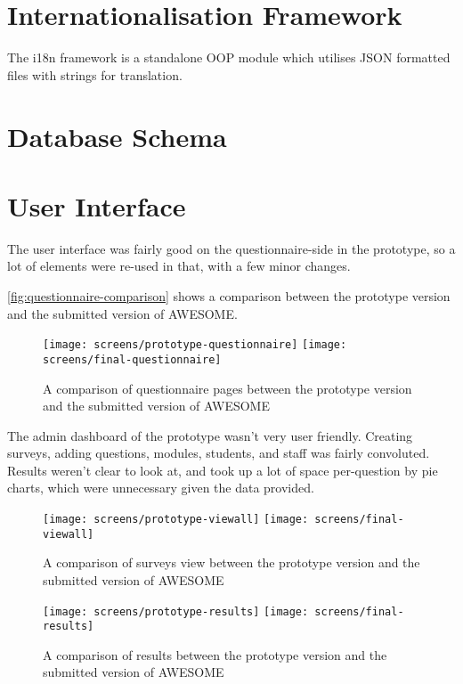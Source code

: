 	
	\section{Internationalisation Framework}
	
	The \ac{i18n} framework is a standalone \ac{OOP} module which utilises JSON formatted files with strings for translation.
	
	\section{Database Schema}
	
	\section{User Interface}
	
	The user interface was fairly good on the questionnaire-side in the prototype, so a lot of elements were re-used in that, with a few minor changes.
	
	\autoref{fig:questionnaire-comparison} shows a comparison between the prototype version and the submitted version of \ac{AWESOME}.
	
	\begin{figure}[h]
		\texttt{[image: screens/prototype-questionnaire]}
		\texttt{[image: screens/final-questionnaire]}
		\caption{A comparison of questionnaire pages between the prototype version and the submitted version of \acs{AWESOME}}
		\label{fig:questionnaire-comparison}
	\end{figure}
	
	The admin dashboard of the prototype wasn't very user friendly.
	Creating surveys, adding questions, modules, students, and staff was fairly convoluted.
	Results weren't clear to look at, and took up a lot of space per-question by pie charts, which were unnecessary given the data provided.
	
	\begin{figure}[h]
		\texttt{[image: screens/prototype-viewall]}
		\texttt{[image: screens/final-viewall]}
		\caption{A comparison of surveys view between the prototype version and the submitted version of \acs{AWESOME}}
		\label{fig:surveys-comparison}
	\end{figure}
	
	\begin{figure}[h]
		\texttt{[image: screens/prototype-results]}
		\texttt{[image: screens/final-results]}
		\caption{A comparison of results between the prototype version and the submitted version of \acs{AWESOME}}
		\label{fig:results-comparison}
	\end{figure}
	
